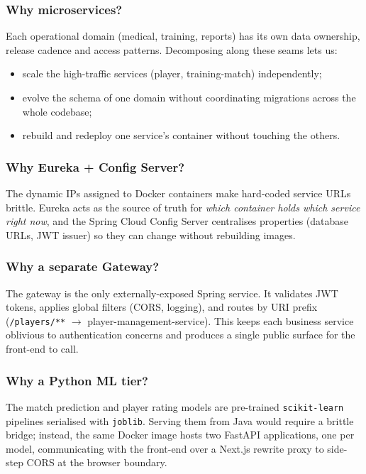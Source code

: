 \documentclass[12pt,a4paper,oneside]{report}
\begin{document}
\subsubsection{Why microservices?}
Each operational domain (medical, training, reports) has its own data
ownership, release cadence and access patterns. Decomposing along these
seams lets us:
\begin{itemize}[leftmargin=*]
  \item scale the high-traffic services (player, training-match) independently;
  \item evolve the schema of one domain without coordinating migrations
        across the whole codebase;
  \item rebuild and redeploy one service's container without touching the
        others.
\end{itemize}

\subsubsection{Why Eureka + Config Server?}
The dynamic IPs assigned to Docker containers make hard-coded service URLs
brittle. Eureka acts as the source of truth for \emph{which container holds
which service right now}, and the Spring Cloud Config Server centralises
properties (database URLs, JWT issuer) so they can change without rebuilding
images.

\subsubsection{Why a separate Gateway?}
The gateway is the only externally-exposed Spring service. It validates JWT
tokens, applies global filters (CORS, logging), and routes by URI prefix
(\texttt{/players/**} $\to$ player-management-service). This keeps each
business service oblivious to authentication concerns and produces a single
public surface for the front-end to call.

\subsubsection{Why a Python ML tier?}
The match prediction and player rating models are pre-trained
\texttt{scikit-learn} pipelines serialised with \texttt{joblib}. Serving them
from Java would require a brittle bridge; instead, the same Docker image
hosts two FastAPI applications, one per model, communicating with the
front-end over a Next.js rewrite proxy to side-step CORS at the browser
boundary.
\end{document}
